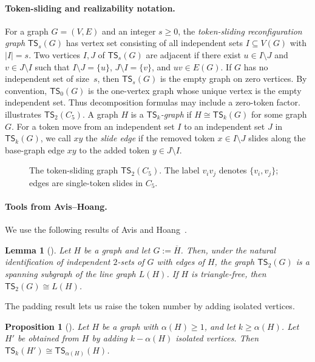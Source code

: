 \documentclass[a4paper]{article}
\theoremstyle{plain}
\newtheorem{lemma}[lemma]{Lemma}
\newtheorem{proposition}[proposition]{Proposition}
\theoremstyle{definition}
\newcommand{\TSsym}{\mathsf{TS}}
\numberwithin{equation}{section}
\begin{document}
\paragraph{Token-sliding and realizability notation.}
For a graph $G=(V,E)$ and an integer $s\ge 0$, the \emph{token-sliding reconfiguration graph} $\TSsym_s(G)$ has vertex set consisting of all independent sets $I\subseteq V(G)$ with $|I|=s$.
Two vertices $I,J$ of $\TSsym_s(G)$ are adjacent if there exist $u\in I\setminus J$ and $v\in J\setminus I$ such that $I\setminus J=\{u\}$, $J\setminus I=\{v\}$, and $uv\in E(G)$.
If $G$ has no independent set of size~$s$, then $\TSsym_s(G)$ is the empty graph on zero vertices.
By convention, $\TSsym_0(G)$ is the one-vertex graph whose unique vertex is the empty independent set.
Thus decomposition formulas may include a zero-token factor.
 illustrates $\TSsym_2(C_5)$.
A graph $H$ is a \emph{$\TSsym_k$-graph} if $H\cong \TSsym_k(G)$ for some graph $G$.
For a token move from an independent set $I$ to an independent set $J$ in $\TSsym_k(G)$, we call $xy$ the \emph{slide edge} if the removed token $x\in I\setminus J$ slides along the base-graph edge $xy$ to the added token $y\in J\setminus I$.
\begin{figure}[ht]
\centering

\caption{The token-sliding graph $\TSsym_2(C_5)$. The label $v_iv_j$ denotes $\{v_i,v_j\}$; edges are single-token slides in $C_5$.}
\label{fig:ts2-c5}
\end{figure}

\paragraph{Tools from Avis--Hoang.}
We use the following results of Avis and Hoang~\cite{AvisHoang2023}.

\begin{lemma}[{\cite[Lem.~1]{AvisHoang2023}}]
\label{lem:line-avis}
Let $H$ be a graph and let $G:=\overline{H}$.
Then, under the natural identification of independent $2$-sets of $G$ with edges of $H$, the graph $\TSsym_2(G)$ is a spanning subgraph of the line graph $L(H)$.
If $H$ is triangle-free, then $\TSsym_2(G)\cong L(H)$.
\end{lemma}

The padding result lets us raise the token number by adding isolated vertices.

\begin{proposition}[{\cite[Prop.~3]{AvisHoang2023}}]
\label{prop:padding}
Let $H$ be a graph with $\alpha(H)\ge 1$, and let $k\ge\alpha(H)$.
Let $H'$ be obtained from $H$ by adding $k-\alpha(H)$ isolated vertices.
Then $\TSsym_k(H')\cong \TSsym_{\alpha(H)}(H)$.
\end{proposition}
\end{document}

